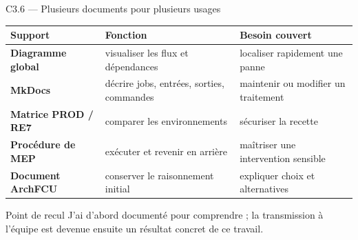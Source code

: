 \begin{frame}{C3.6 — Plusieurs documents pour plusieurs usages}
\scriptsize
\begin{tabularx}{\linewidth}{>{\bfseries}p{3.0cm}X X}
\toprule
Support & Fonction & Besoin couvert \\
\midrule
Diagramme global & visualiser les flux et dépendances & localiser rapidement une panne \\
MkDocs & décrire jobs, entrées, sorties, commandes & maintenir ou modifier un traitement \\
Matrice PROD / RE7 & comparer les environnements & sécuriser la recette \\
Procédure de MEP & exécuter et revenir en arrière & maîtriser une intervention sensible \\
Document ArchFCU & conserver le raisonnement initial & expliquer choix et alternatives \\
\bottomrule
\end{tabularx}
\vspace{0.7em}
\begin{block}{Point de recul}
J'ai d'abord documenté pour comprendre ; la transmission à l'équipe est devenue ensuite un résultat concret de ce travail.
\end{block}
\end{frame}

